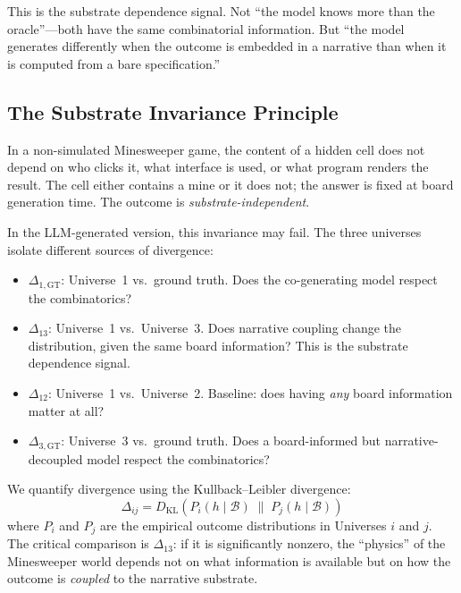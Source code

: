 \documentclass[12pt,a4paper]{article}
\begin{document}
This is the substrate dependence signal. Not ``the model knows more than the oracle''---both have the same combinatorial information. But ``the model generates differently when the outcome is embedded in a narrative than when it is computed from a bare specification.''\

\subsection{The Substrate Invariance Principle}
\label{sec:invariance}

In a non-simulated Minesweeper game, the content of a hidden cell does not depend on who clicks it, what interface is used, or what program renders the result. The cell either contains a mine or it does not; the answer is fixed at board generation time. The outcome is \emph{substrate-independent}.

In the LLM-generated version, this invariance may fail. The three universes isolate different sources of divergence:

\begin{itemize}[nosep]
    \item $\Delta_{1,\text{GT}}$: Universe~1 vs.\ ground truth. Does the co-generating model respect the combinatorics?
    \item $\Delta_{13}$: Universe~1 vs.\ Universe~3. Does narrative coupling change the distribution, given the same board information? This is the substrate dependence signal.
    \item $\Delta_{12}$: Universe~1 vs.\ Universe~2. Baseline: does having \emph{any} board information matter at all?
    \item $\Delta_{3,\text{GT}}$: Universe~3 vs.\ ground truth. Does a board-informed but narrative-decoupled model respect the combinatorics?
\end{itemize}

We quantify divergence using the Kullback--Leibler divergence:
\begin{equation}
\Delta_{ij} = D_{\mathrm{KL}}\!\left(P_i(h \mid \mathcal{B}) \;\|\; P_j(h \mid \mathcal{B})\right)
\label{eq:substrate_dep}
\end{equation}
where $P_i$ and $P_j$ are the empirical outcome distributions in Universes $i$ and $j$. The critical comparison is $\Delta_{13}$: if it is significantly nonzero, the ``physics'' of the Minesweeper world depends not on what information is available but on how the outcome is \emph{coupled} to the narrative substrate.
\end{document}
